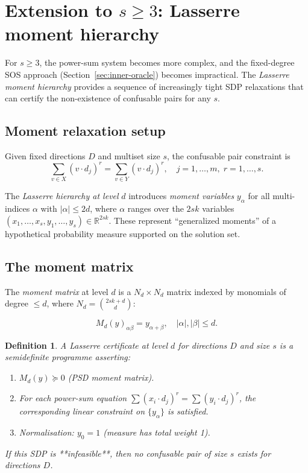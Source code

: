 \documentclass[12pt,a4paper]{article}
\newtheorem{definition}{Definition}
\begin{document}
\section{Extension to \texorpdfstring{$s \geq 3$}{s >= 3}: Lasserre moment hierarchy}
\label{sec:lasserre}

For $s \geq 3$, the power-sum system becomes more complex, and the fixed-degree SOS
approach (Section~\ref{sec:inner-oracle}) becomes impractical.  The \emph{Lasserre
moment hierarchy} provides a sequence of increasingly tight SDP relaxations that can
certify the non-existence of confusable pairs for any $s$.

\subsection*{Moment relaxation setup}

Given fixed directions $D$ and multiset size $s$, the confusable pair constraint is
\[
  \sum_{v \in X} (v \cdot d_j)^r = \sum_{v \in Y} (v \cdot d_j)^r,
  \quad j=1,\ldots,m,\; r=1,\ldots,s.
\]

The \emph{Lasserre hierarchy at level} $d$ introduces \emph{moment variables}
$y_\alpha$ for all multi-indices $\alpha$ with $|\alpha| \leq 2d$, where $\alpha$
ranges over the $2sk$ variables $(x_1, \ldots, x_s, y_1, \ldots, y_s) \in \mathbb{R}^{2sk}$.
These represent ``generalized moments'' of a hypothetical probability measure supported
on the solution set.

\subsection*{The moment matrix}

The \emph{moment matrix} at level $d$ is a $N_d \times N_d$ matrix indexed by monomials
of degree $\leq d$, where $N_d = \binom{2sk + d}{d}$:

\[
  M_d(y)_{\alpha\beta} = y_{\alpha+\beta}, \quad |\alpha|, |\beta| \leq d.
\]

\begin{definition}
  A \emph{Lasserre certificate at level} $d$ for directions $D$ and size $s$ is a
  semidefinite programme asserting:
  \begin{enumerate}
    \item $M_d(y) \succeq 0$ (PSD moment matrix).
    \item For each power-sum equation $\sum (x_i \cdot d_j)^r = \sum (y_i \cdot d_j)^r$,
          the corresponding linear constraint on $\{y_\alpha\}$ is satisfied.
    \item Normalisation: $y_0 = 1$ (measure has total weight 1).
  \end{enumerate}
  If this SDP is **infeasible**, then no confusable pair of size $s$ exists for directions $D$.
\end{definition}
\end{document}
